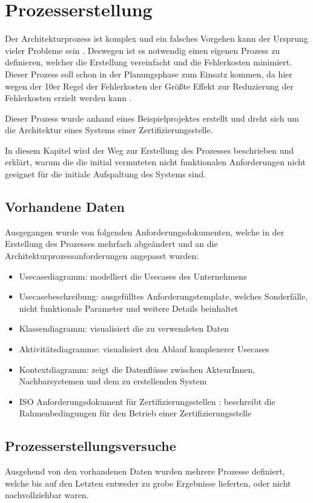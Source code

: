 \chapter{Prozesserstellung}
Der Architekturprozess ist komplex und ein falsches Vorgehen kann der Ursprung vieler Probleme sein \cite[S. 7-8]{softarch}. Deswegen ist es notwendig einen eigenen Prozess zu definieren, welcher die Erstellung vereinfacht und die Fehlerkosten minimiert. Dieser Prozess soll schon in der Planungsphase zum Einsatz kommen, da hier wegen der 10er Regel der Fehlerkosten der Größte Effekt zur Reduzierung der Fehlerkosten erzielt werden kann \cite[S. 154]{fehler}.

Dieser Prozess wurde anhand eines Beispielprojektes erstellt und dreht sich um die Architektur eines Systems einer Zertifizierungsstelle.

In diesem Kapitel wird der Weg zur Erstellung des Prozesses beschrieben und erklärt, warum die die initial vermuteten nicht funktionalen Anforderungen nicht geeignet für die initiale Aufspaltung des Systems sind.

\section{Vorhandene Daten}
Ausgegangen wurde von folgenden Anforderungsdokumenten, welche in der Erstellung des Prozesses mehrfach abgeändert und an die Architekturprozessanforderungen angepasst wurden:

\begin{itemize}
  \item Usecasediagramm: modelliert die Usecases des Unternehmens
  \item Usecasebeschreibung: ausgefülltes Anforderungstemplate, welches Sonderfälle, nicht funktionale Parameter und weitere Details beinhaltet
  \item Klassendiagramm: visualisiert die zu verwendeten Daten
  \item Aktivitätsdiagramme: visualisiert den Ablauf komplexerer Usecases
  \item Kontextdiagramm: zeigt die Datenflüsse zwischen AkteurInnen, Nachbarsystemen und dem zu erstellenden System
  \item ISO Anforderungsdokument für Zertifizierungsstellen \cite{ISO_CERT}: beschreibt die Rahmenbedingungen für den Betrieb einer Zertifizierungsstelle
\end{itemize}


\section{Prozesserstellungsversuche}
Ausgehend von den vorhandenen Daten wurden mehrere Prozesse definiert, welche bis auf den Letzten entweder zu grobe Ergebnisse lieferten, oder nicht nachvollziehbar waren.

